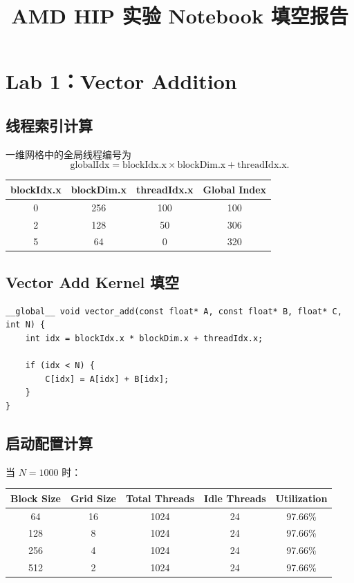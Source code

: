 \documentclass[UTF8,a4paper,12pt,fontset=none]{ctexart}
\title{AMD HIP 实验 Notebook 填空报告}
\author{}
\date{}
\begin{document}
\maketitle

\section{Lab 1：Vector Addition}

\subsection{线程索引计算}

一维网格中的全局线程编号为
\[
  \text{globalIdx}=\text{blockIdx.x}\times \text{blockDim.x}+\text{threadIdx.x}.
\]

\begin{center}
\begin{tabular}{cccc}
\toprule
blockIdx.x & blockDim.x & threadIdx.x & Global Index \\
\midrule
0 & 256 & 100 & 100 \\
2 & 128 & 50 & 306 \\
5 & 64 & 0 & 320 \\
\bottomrule
\end{tabular}
\end{center}

\subsection{Vector Add Kernel 填空}

\begin{lstlisting}
__global__ void vector_add(const float* A, const float* B, float* C, int N) {
    int idx = blockIdx.x * blockDim.x + threadIdx.x;

    if (idx < N) {
        C[idx] = A[idx] + B[idx];
    }
}
\end{lstlisting}

\subsection{启动配置计算}

当 $N=1000$ 时：

\begin{center}
\begin{tabular}{ccccc}
\toprule
Block Size & Grid Size & Total Threads & Idle Threads & Utilization \\
\midrule
64  & 16 & 1024 & 24  & 97.66\% \\
128 & 8  & 1024 & 24  & 97.66\% \\
256 & 4  & 1024 & 24  & 97.66\% \\
512 & 2  & 1024 & 24  & 97.66\% \\
\bottomrule
\end{tabular}
\end{center}
\end{document}
